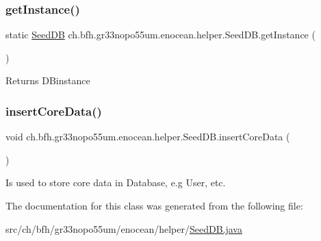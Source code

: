 \subsubsection{\texorpdfstring{get\+Instance()}{getInstance()}}
{\footnotesize\ttfamily static \hyperlink{classch_1_1bfh_1_1gr33nopo55um_1_1enocean_1_1helper_1_1_seed_d_b}{Seed\+DB} ch.\+bfh.\+gr33nopo55um.\+enocean.\+helper.\+Seed\+D\+B.\+get\+Instance (\begin{DoxyParamCaption}{ }\end{DoxyParamCaption})\hspace{0.3cm}{\ttfamily [static]}}

\begin{DoxyReturn}{Returns}
D\+Binstance 
\end{DoxyReturn}
\hypertarget{classch_1_1bfh_1_1gr33nopo55um_1_1enocean_1_1helper_1_1_seed_d_b_a08fea8281a49f2b4c2ea304a8678b5c6}{}\label{classch_1_1bfh_1_1gr33nopo55um_1_1enocean_1_1helper_1_1_seed_d_b_a08fea8281a49f2b4c2ea304a8678b5c6} 
\subsubsection{\texorpdfstring{insert\+Core\+Data()}{insertCoreData()}}
{\footnotesize\ttfamily void ch.\+bfh.\+gr33nopo55um.\+enocean.\+helper.\+Seed\+D\+B.\+insert\+Core\+Data (\begin{DoxyParamCaption}{ }\end{DoxyParamCaption})}

Is used to store core data in Database, e.\+g User, etc. 

The documentation for this class was generated from the following file\+:\begin{DoxyCompactItemize}
\item 
src/ch/bfh/gr33nopo55um/enocean/helper/\hyperlink{_seed_d_b_8java}{Seed\+D\+B.\+java}\end{DoxyCompactItemize}
